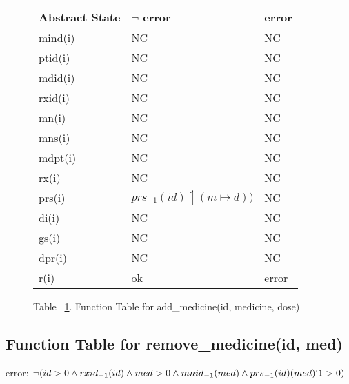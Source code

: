 \begin{figure}[h]
\begin{center}
\begin{tabular}{|l|l|l|}
\hline
Abstract State & $\neg$ error & error \\ \hline
mind(i)        &   NC        & NC    \\ \hline
ptid(i)        &     NC      & NC    \\ \hline
mdid(i)        &   NC        & NC    \\ \hline
rxid(i)        &     NC      & NC    \\ \hline
mn(i)          &    NC       & NC    \\ \hline
mns(i)         &   NC        & NC    \\ \hline
mdpt(i)        &   NC        & NC    \\ \hline
rx(i)          &      NC     & NC    \\ \hline
prs(i)         &     $prs_{-1}(id) \upharpoonleft (m \mapsto d))$      & NC    \\ \hline
di(i)          &      NC     & NC    \\ \hline
gs(i)          &     NC      & NC    \\ \hline
dpr(i)         &     NC      & NC    \\ \hline
r(i)           & ok        & error \\ \hline
\end{tabular}
\caption{Table ~\ref{ft-am}. Function Table for add\_medicine(id, medicine, dose)}
\label{ft-am}
\end{center}
\end{figure}

\newpage

\subsection{Function Table for remove\_medicine(id, med)}

error: $\neg (\newline id > 0 \newline\wedge rxid_{-1}(id) \newline\wedge med > 0 \newline\wedge mnid_{-1}(med) \newline\wedge prs_{-1}(id)(med)`1 > 0)$


